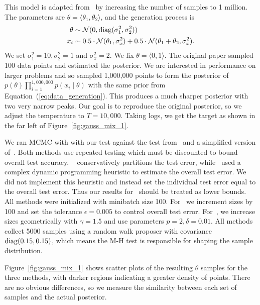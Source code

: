 \documentclass{article}
\begin{document}
This model is adapted from~\cite{langevin_2011} by increasing the number
of samples to 1 million.  The parameters are $\theta = \langle \theta_1,\theta_2 \rangle$, and the
generation process is
\begin{equation}\label{eq:data_generation}
\begin{split}
    \theta &\sim \mathcal{N}(0, {\rm diag}(\sigma_1^2,\sigma_2^2)) \\
    x_i & \sim 0.5 \cdot \mathcal{N}(\theta_1, \sigma_x^2) + 0.5 \cdot \mathcal{N}(\theta_1+\theta_2, \sigma_x^2).
\end{split}
\end{equation}
We set $\sigma_1^2 = 10, \sigma_2^2 = 1$ and $\sigma_x^2=2$.  We fix $\theta =
\langle 0,1 \rangle$. The original paper sampled 100 data points and estimated
the posterior. We are interested in performance on larger problems and so
sampled 1,000,000 points to form the posterior of
$p(\theta)\prod_{i=1}^{1,000,000}p(x_i\mid \theta)$ with the same prior from
Equation~(\ref{eq:data_generation}). This produces a much sharper posterior with
two very narrow peaks.  Our goal is to reproduce the original posterior, so we
adjust the temperature to $T=10,000$.  Taking logs, we get the target as shown
in the far left of Figure~\ref{fig:gauss_mix_1}.

We ran MCMC with with our test against the test
from~\cite{icml2014c1_bardenet14} and a simplified version
of~\cite{cutting_mh_2014}. Both methods use repeated testing which
must be discounted to bound overall test
accuracy. ~\cite{icml2014c1_bardenet14} conservatively partitions the
test error, while~\cite{cutting_mh_2014} used a complex dynamic
programming heuristic to estimate the overall test error. We did not
implement this heuristic and instead set the individual test error
equal to the overall test error. Thus our results
for~\cite{cutting_mh_2014} should be treated as lower bounds. All
methods were initialized with minibatch size 100.
For~\cite{cutting_mh_2014} we increment sizes by 100 and set the
tolerance $\epsilon=0.005$ to control overall test error.
For~\cite{icml2014c1_bardenet14}, we increase sizes geometrically
with $\gamma = 1.5$ and use parameters $p = 2, \delta = 0.01$.  All
methods collect 5000 samples using a random walk proposer with
covariance ${\rm diag}(0.15, 0.15)$, which means the M-H test is
responsible for shaping the sample distribution.

Figure~\ref{fig:gauss_mix_1} shows scatter plots of the resulting $\theta$
samples for the three methods, with darker regions indicating a greater density
of points. There are no obvious differences, so we measure the similarity
between each set of samples and the actual posterior. 
\end{document}
